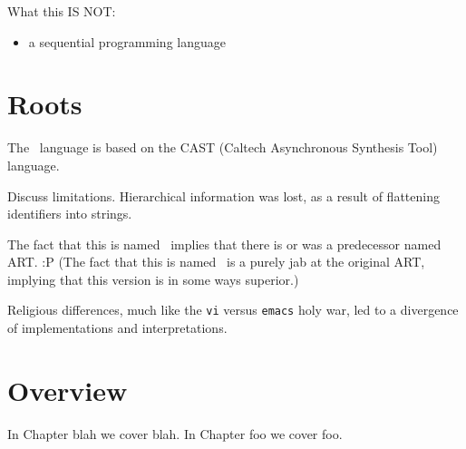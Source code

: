 What this IS NOT:
\begin{itemize}
\item a sequential programming language
\end{itemize}

\section{Roots}
\label{sec:intro:roots}

The \artxx\ language is based on the CAST
(Caltech Asynchronous Synthesis Tool) language.  

Discuss limitations.  
Hierarchical information was lost, as a result of 
flattening identifiers into strings.  

The fact that this is named \artxx\ implies that there is or was a 
predecessor named ART.  :P
(The fact that this is named \artxx\ is a purely jab at the original ART, 
implying that this version is in some ways superior.)

Religious differences, much like the
\texttt{vi} versus \texttt{emacs} holy war, 
led to a divergence of implementations and interpretations.  


\section{Overview}
\label{sec:intro:overview}

In Chapter blah we cover blah.  
In Chapter foo we cover foo.  


